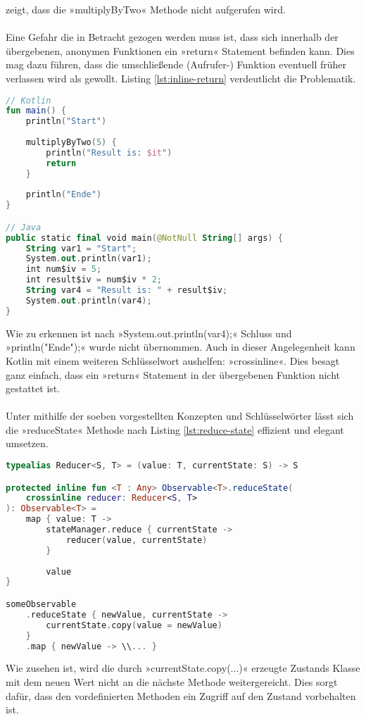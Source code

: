 zeigt, dass die »multiplyByTwo« Methode nicht aufgerufen wird.
\\\\
Eine Gefahr die in Betracht gezogen werden muss ist, dass sich innerhalb der übergebenen, anonymen Funktionen ein »return« Statement befinden kann. Dies mag dazu führen, dass die umschließende (Aufrufer-) Funktion eventuell früher verlassen wird als gewollt. Listing
\ref{lst:inline-return}
verdeutlicht die Problematik.
\begin{lstlisting}[caption={inline mit »return«}, label={lst:inline-compiled},language=Kotlin]
// Kotlin
fun main() {
	println("Start")
	
	multiplyByTwo(5) {
		println("Result is: $it")
		return
	}
	
	println("Ende")
}

// Java
public static final void main(@NotNull String[] args) {
	String var1 = "Start";
	System.out.println(var1);
	int num$iv = 5;
	int result$iv = num$iv * 2;
	String var4 = "Result is: " + result$iv;
	System.out.println(var4);
}
\end{lstlisting}
\bigskip
Wie zu erkennen ist nach »System.out.println(var4);« Schluss und »println("Ende");« wurde nicht übernommen. Auch in dieser Angelegenheit kann Kotlin mit einem weiteren Schlüsselwort aushelfen: »crossinline«. Dies besagt ganz einfach, dass ein »return« Statement in der übergebenen Funktion nicht gestattet ist.
\\\\
Unter mithilfe der soeben vorgestellten Konzepten und Schlüsselwörter lässt sich die »reduceState« Methode nach Listing
\ref{lst:reduce-state}
effizient und elegant umsetzen.
\begin{lstlisting}[caption={»reduceState« Methode}, label={lst:reduce-state},language=Kotlin]
typealias Reducer<S, T> = (value: T, currentState: S) -> S

protected inline fun <T : Any> Observable<T>.reduceState(
	crossinline reducer: Reducer<S, T>
): Observable<T> =
	map { value: T ->
		stateManager.reduce { currentState ->
			reducer(value, currentState)
		}
	
		value
}

someObservable
	.reduceState { newValue, currentState ->
		currentState.copy(value = newValue)
	}
	.map { newValue -> \\... }
\end{lstlisting}
\bigskip
Wie zusehen ist, wird die durch »currentState.copy(...)« erzeugte Zustands Klasse mit dem neuen Wert nicht an die nächste Methode weitergereicht. Dies sorgt dafür, dass den vordefinierten Methoden ein Zugriff auf den Zustand vorbehalten ist.

